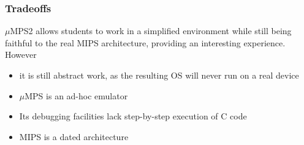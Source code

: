 \documentclass[table,xcdraw]{beamer}
\begin{document}
\begin{frame}[fragile]
    \frametitle{Tradeoffs}
    $\mu$MPS2 allows students to work in a simplified environment while still being
    faithful to the real MIPS architecture, providing an interesting experience.
    However
    \begin{itemize}
        \item it is still abstract work, as the resulting OS will never run on a real device
        \item $\mu$MPS is an ad-hoc emulator
        \item Its debugging facilities lack step-by-step execution of C code
        \item MIPS is a dated architecture
    \end{itemize}

\end{frame}
\end{document}
